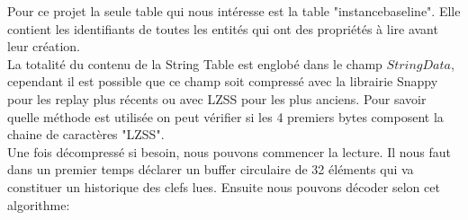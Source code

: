 \documentclass{article}
\begin{document}
Pour ce projet la seule table qui nous intéresse est la table "instancebaseline". Elle contient les identifiants de toutes les entités qui ont des propriétés à lire avant leur création.\\

La totalité du contenu de la String Table est englobé dans le champ $StringData$, cependant il est possible que ce champ soit compressé avec la librairie Snappy pour les replay plus récents ou avec LZSS pour les plus anciens. Pour savoir quelle méthode est utilisée on peut vérifier si les 4 premiers bytes composent la chaine de caractères "LZSS".\\
Une fois décompressé si besoin, nous pouvons commencer la lecture. Il nous faut dans un premier temps déclarer un buffer circulaire de 32 éléments qui va constituer un historique des clefs lues. Ensuite nous pouvons décoder selon cet algorithme:\\
\end{document}
